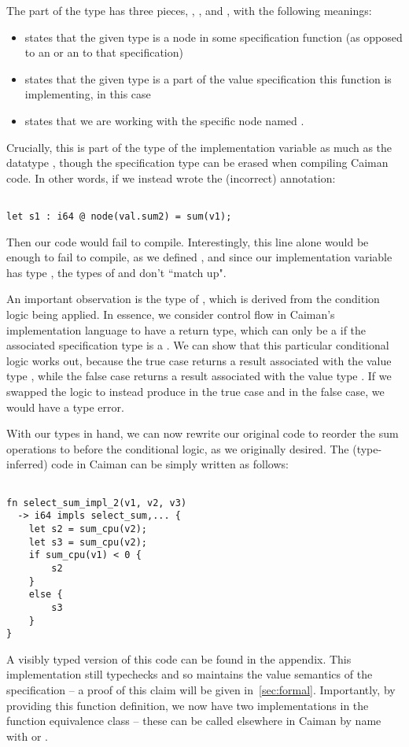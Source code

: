 The part of the type  has three pieces, , , and , with the following meanings:
%
\begin{itemize}
\item {} states that the given type is a node in some specification function (as opposed to an  or an  to that specification)
\item {} states that the given type is a part of the value specification this function is implementing,  in this case
\item {} states that we are working with the specific node named .
\end{itemize}
%
Crucially, this is part of the type of the implementation variable as much as the datatype , though the specification type can be erased when compiling Caiman code.  In other words, if we instead wrote the (incorrect) annotation:
%
\begin{lstlisting}

let s1 : i64 @ node(val.sum2) = sum(v1);
\end{lstlisting}
%
Then our code would fail to compile.  Interestingly, this line alone would be enough to fail to compile, as we defined , and since our implementation variable  has type , the types of  and  don't ``match up".

An important observation is the type of , which is derived from the  condition logic being applied.  In essence, we consider control flow in Caiman's implementation language to have a return type, which can only be a  if the associated specification type is a .  We can show that this particular conditional logic works out, because the true case returns a result associated with the value type , while the false case returns a result associated with the value type .  If we swapped the logic to instead produce  in the true case and  in the false case, we would have a type error.

With our types in hand, we can now rewrite our original code to reorder the sum operations to before the conditional logic, as we originally desired.  The (type-inferred) code in Caiman can be simply written as follows:
%
\begin{lstlisting}

fn select_sum_impl_2(v1, v2, v3) 
  -> i64 impls select_sum,... {
    let s2 = sum_cpu(v2);
    let s3 = sum_cpu(v2);
    if sum_cpu(v1) < 0 {
        s2
    }
    else {
        s3
    }
}
\end{lstlisting}
%
A visibly typed version of this code can be found in the appendix.  This implementation still typechecks and so maintains the value semantics of the  specification -- a proof of this claim will be given in~\ref{sec:formal}.  Importantly, by providing this function definition, we now have two implementations in the  function equivalence class -- these can be called elsewhere in Caiman by name with  or .

